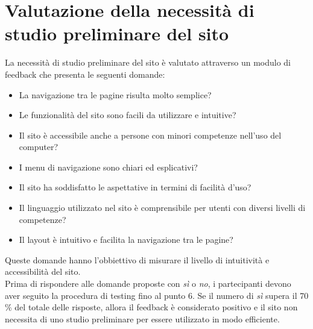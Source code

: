 \documentclass{article}
\begin{document}
\section{Valutazione della necessità di studio preliminare del sito}
La necessità di studio preliminare del sito è valutato attraverso un modulo di feedback che presenta le seguenti domande:
\begin{itemize}
    \item La navigazione tra le pagine risulta molto semplice?
    \item Le funzionalità del sito sono facili da utilizzare e intuitive?
    \item Il sito è accessibile anche a persone con minori competenze nell'uso del computer?
    \item I menu di navigazione sono chiari ed esplicativi?
    \item Il sito ha soddisfatto le aspettative in termini di facilità d'uso?
    \item Il linguaggio utilizzato nel sito è comprensibile per utenti con diversi livelli di competenze?
    \item Il layout è intuitivo e facilita la navigazione tra le pagine?
\end{itemize}
Queste domande hanno l'obbiettivo di misurare il livello di intuitività e accessibilità del sito.\\
Prima di rispondere alle domande proposte con \textit{sì} o \textit{no}, i partecipanti devono aver seguito la procedura di testing fino al punto 6. Se il numero di \textit{sì} supera il 70 \% del totale delle risposte, allora il feedback è considerato positivo e il sito non necessita di uno studio preliminare per essere utilizzato in modo efficiente.

\vspace{0.7cm}
\end{document}
